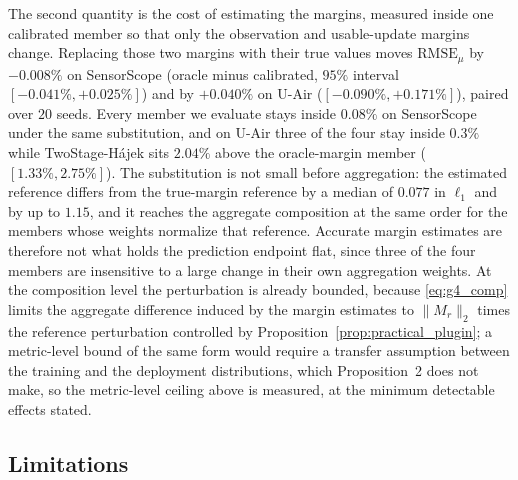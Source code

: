 \documentclass[letterpaper,journal]{IEEEtran}
\begin{document}
The second quantity is the cost of estimating the margins, measured inside one
calibrated member so that only the observation and usable-update margins change.
Replacing those two margins with their true values moves $\mathrm{RMSE}_{\mu}$ by
$-0.008\%$ on SensorScope (oracle minus calibrated,
$95\%$ interval $[-0.041\%,+0.025\%]$) and by $+0.040\%$ on U-Air
($[-0.090\%,+0.171\%]$), paired over $20$ seeds.  Every member we evaluate stays
inside $0.08\%$ on SensorScope under the same substitution, and on U-Air three of
the four stay inside $0.3\%$ while TwoStage-H\'ajek sits $2.04\%$ above the
oracle-margin member ($[1.33\%,2.75\%]$).  The substitution is not small before
aggregation: the estimated reference differs from the true-margin reference by a
median of $0.077$ in $\ell_1$ and by up to $1.15$, and it reaches the aggregate
composition at the same order for the members whose weights normalize that
reference.  Accurate margin estimates are therefore not what holds the prediction
endpoint flat, since three of the four members are insensitive to a large change
in their own aggregation weights.  At the composition level the perturbation is
already bounded, because \eqref{eq:g4_comp} limits the aggregate difference
induced by the margin estimates to $\|M_r\|_2$ times the reference perturbation
controlled by Proposition~\ref{prop:practical_plugin}; a metric-level bound of
the same form would require a transfer assumption between the training and the
deployment distributions, which Proposition~2 does not make, so the metric-level
ceiling above is measured, at the minimum detectable effects stated.

\subsection{Limitations}
\label{subsec:limitations}
\end{document}
